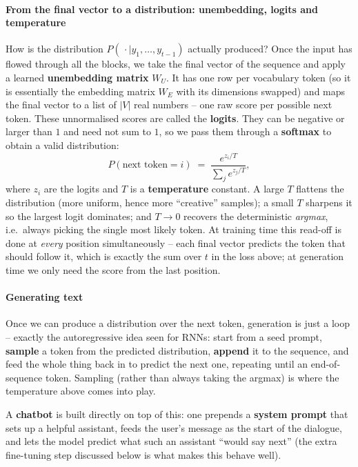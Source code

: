 \paragraph{From the final vector to a distribution: unembedding, logits and temperature}
How is the distribution $P(\,\cdot \mid y_{1}, \dots, y_{t-1})$ actually produced? Once the
input has flowed through all the blocks, we take the final vector of the sequence and apply a
learned \textbf{unembedding matrix} $W_{U}$. It has one row per vocabulary token (so it is
essentially the embedding matrix $W_{E}$ with its dimensions swapped) and maps the final
vector to a list of $|V|$ real numbers -- one raw score per possible next token. These
unnormalised scores are called the \textbf{logits}. They can be negative or larger than $1$
and need not sum to $1$, so we pass them through a \textbf{softmax} to obtain a valid
distribution:
\[
  P(\text{next token} = i) \;=\; \frac{e^{z_{i}/T}}{\sum_{j} e^{z_{j}/T}},
\]
where $z_{i}$ are the logits and $T$ is a \textbf{temperature} constant. A large $T$ flattens
the distribution (more uniform, hence more ``creative'' samples); a small $T$ sharpens it so
the largest logit dominates; and $T \to 0$ recovers the deterministic \emph{argmax}, i.e.\
always picking the single most likely token. At training time this read-off is done at
\emph{every} position simultaneously -- each final vector predicts the token that should follow
it, which is exactly the sum over $t$ in the loss above; at generation time we only need the
score from the last position.

\paragraph{Generating text}
Once we can produce a distribution over the next token, generation is just a loop -- exactly
the autoregressive idea seen for RNNs: start from a seed prompt, \textbf{sample} a token from
the predicted distribution, \textbf{append} it to the sequence, and feed the whole thing back
in to predict the next one, repeating until an end-of-sequence token. Sampling (rather than
always taking the argmax) is where the temperature above comes into play.

A \textbf{chatbot} is built directly on top of this: one prepends a \textbf{system prompt} that sets up a helpful
assistant, feeds the user's message as the start of the dialogue, and lets the model predict
what such an assistant ``would say next'' (the extra fine-tuning step discussed below is what
makes this behave well).

